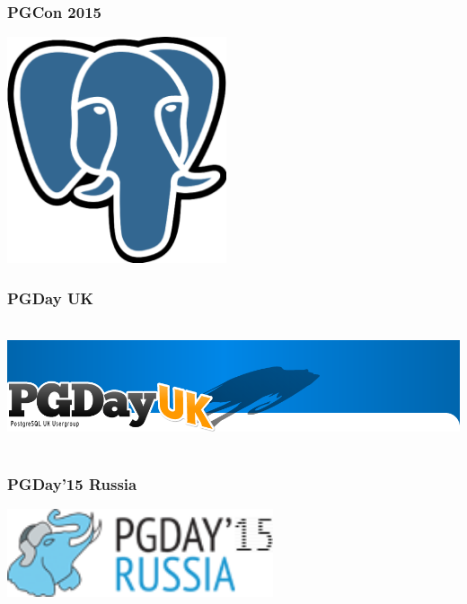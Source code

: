 \documentclass{beamer}
\begin{document}
\begin{frame}[fragile]
  \frametitle{PGCon 2015}

  
  \begin{center}
    \includegraphics[height=18em]{postgres-logo.eps}
  \end{center}
\end{frame}

\begin{frame}[fragile]
  \frametitle{PGDay UK}

  
  \begin{center}
    \includegraphics[height=10em]{pgdayuk.png}
  \end{center}
\end{frame}

\begin{frame}[fragile]
  \frametitle{PGDay'15 Russia}

  
  \begin{center}
    \includegraphics[height=7em]{pgdayrussia2015.png}
  \end{center}
\end{frame}
\end{document}
